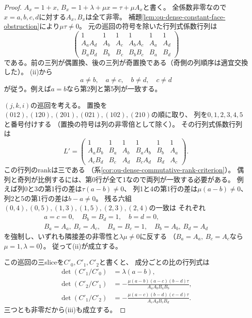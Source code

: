 \begin{proof}
$A_x=1+x$, $B_x=1+\lambda+\mu x=\tau+\mu A_x$と書く。
全係数非零なので$x=a,b,c,d$に対する$A_x,B_x$は全て非零。
補題\ref{lem:ou-dense-constant-face-obstruction}により$\mu\tau\ne0$。
元の巡回の符号を除いた行列式係数行列は
\[
 \begin{pmatrix}
 1&1&1&1&1&1\\
 A_aA_d&A_b&A_c&A_bA_c&A_a&A_d\\
 B_aB_d&B_b&B_c&B_bB_c&B_a&B_d
 \end{pmatrix}
\]
である。前の三列が偶置換、後の三列が奇置換である（奇側の列順序は適宜交換した）。
(ii)から
\[
 a\ne b,\quad a\ne c,\quad b\ne d,\quad c\ne d
\]
が従う。例えば$a=b$なら第2列と第5列が一致する。

$(j,k,i)$の巡回を考える。
置換を
$(012),(120),(201),(021),(102),(210)$の順に取り、
列を$0,1,2,3,4,5$と番号付けする
（置換の符号は列の非零倍として除く）。
その行列式係数行列は
\[
 L'=\begin{pmatrix}
 1&1&1&1&1&1\\
 A_aB_b&B_a&A_b&B_aA_b&B_b&A_a\\
 A_cB_d&B_c&A_d&B_cA_d&B_d&A_c
 \end{pmatrix}.
\]
この行列のrankは三である
（系\ref{cor:ou-dense-commutative-rank-criterion}）。
偶列と奇列が比例するには、第0行が全て1なので両列が一致する必要がある。
例えば列0と3の第1行の差は$\tau(a-b)\ne0$、
列1と4の第1行の差は$\mu(a-b)\ne0$、
列2と5の第1行の差は$b-a\ne0$。
残る六組$(0,4),(0,5),(1,3),(1,5),(2,3),(2,4)$の一致は
それぞれ
\[
 \begin{gathered}
 a=c=0,\quad B_b=B_d=1,\quad b=d=0,\\
 B_a=A_a,\ B_c=A_c,\quad B_a=B_c=1,\quad
 B_b=A_b,\ B_d=A_d
 \end{gathered}
\]
を強制し、いずれも隣接差の非零性と$\lambda\mu\ne0$に反する
（$B_a=A_a,\ B_c=A_c$なら$\mu=1,\lambda=0$）。
従って(ii)が成立する。

この巡回の三sliceを$C'_0,C'_1,C'_2$と書くと、
成分ごとの比の行列式は
\[
 \begin{split}
 \det(C'_1/C'_0)&=\lambda(a-b),\\
 \det(C'_2/C'_1)&=
 -\frac{\mu(a-b)(a-c)(b-d)\tau}{A_aA_bB_aB_b},\\
 \det(C'_1/C'_2)&=
 -\frac{\mu(a-c)(b-d)(c-d)\tau}{A_cA_dB_cB_d}.
 \end{split}
\]
三つとも非零だから(iii)も成立する。


\end{proof}
